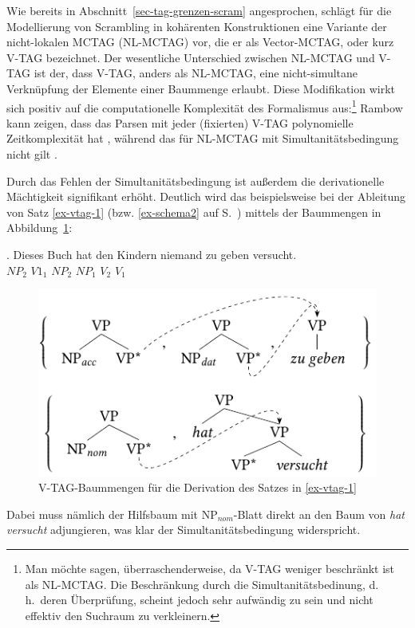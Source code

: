 Wie bereits in Abschnitt~\ref{sec-tag-grenzen-scram} angesprochen, schlägt \cite{Rambow:94} für die Modellierung von Scrambling in kohärenten Konstruktionen eine Variante der nicht-lokalen MCTAG (NL-MCTAG) vor, die er als Vector-MCTAG, oder kurz V-TAG bezeichnet. Der wesentliche Unterschied zwischen NL-MCTAG und V-TAG ist der, dass V-TAG, anders als NL-MCTAG, eine nicht-simultane Verknüpfung der Elemente einer Baummenge erlaubt. Diese Modifikation wirkt sich positiv auf die computationelle Komplexität des Formalismus aus:\footnote{Man möchte sagen, überraschenderweise, da V-TAG weniger beschränkt ist als NL-MCTAG. Die Beschränkung durch die Simultanitätsbedinung, d.\,h.\ deren Überprüfung, scheint jedoch sehr aufwändig zu sein und nicht effektiv den Suchraum zu verkleinern.} Rambow kann zeigen, dass das Parsen mit jeder (fixierten) V-TAG polynomielle Zeitkomplexität hat \cite[120ff]{Rambow:94}, während das für NL-MCTAG mit Simultanitätsbedingung nicht gilt \citep{Rambow:Satta:92,Champollion:11a}. 

Durch das Fehlen der Simultanitätsbedingung ist au\ss erdem die derivationelle Mächtigkeit signifikant erhöht. Deutlich wird das beispielsweise bei der Ableitung von Satz \ref{ex-vtag-1} (bzw. \ref{ex-schema2} auf S.~\pageref{ex-schema2}) mittels der Baummengen in Abbildung~\ref{fig-vtag-1}:

\exg. {Dieses Buch} hat {den Kindern} niemand {zu geben} versucht.  \\
$\mathit{NP}_2$ $V1_1$ $\mathit{NP}_2$ $\mathit{NP}_1$ $V_2$ $V_1$ \\
\citep[42]{Rambow:94} \label{ex-vtag-1}

\begin{figure}[t]
\centering
\includegraphics{graphics/abb66.pdf}
\caption{V-TAG-Baummengen für die Derivation des Satzes in \ref{ex-vtag-1}\label{fig-vtag-1}}
\end{figure}
Dabei muss nämlich der Hilfsbaum mit NP$_{nom}$-Blatt direkt an den Baum von {\it hat versucht} adjungieren, was klar der Simultanitätsbedingung widerspricht.

